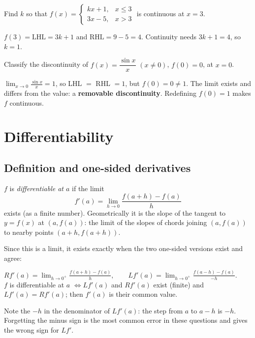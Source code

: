 \begin{example}
Find $k$ so that $f(x)=\begin{cases}kx+1,&x\le3\\ 3x-5,&x>3\end{cases}$ is continuous at $x=3$.
\end{example}
\begin{solution}
$f(3)=\text{LHL}=3k+1$ and $\text{RHL}=9-5=4$. Continuity needs $3k+1=4$, so $k=1$.
\end{solution}

\begin{example}
Classify the discontinuity of $f(x)=\dfrac{\sin x}{x}$ $(x\ne0)$, $f(0)=0$, at $x=0$.
\end{example}
\begin{solution}
$\lim_{x\to0}\frac{\sin x}{x}=1$, so LHL $=$ RHL $=1$, but $f(0)=0\ne1$. The limit exists and differs from the value: a \textbf{removable discontinuity}. Redefining $f(0)=1$ makes $f$ continuous.
\end{solution}

\section{Differentiability}\label{sec:lim-diff}

\subsection{Definition and one-sided derivatives}
\begin{definition}[Derivative]
$f$ is \emph{differentiable at $a$} if the limit
\[
f'(a)=\lim_{h\to0}\frac{f(a+h)-f(a)}{h}
\]
exists (as a finite number). Geometrically it is the slope of the tangent to $y=f(x)$ at $(a,f(a))$: the limit of the slopes of chords joining $(a,f(a))$ to nearby points $(a+h,f(a+h))$.
\end{definition}
Since this is a limit, it exists exactly when the two one-sided versions exist and agree:
\begin{keybox}
$\displaystyle Rf'(a)=\lim_{h\to0^+}\frac{f(a+h)-f(a)}{h},\qquad Lf'(a)=\lim_{h\to0^+}\frac{f(a-h)-f(a)}{-h}.$\\[4pt]
$f$ is differentiable at $a$ \quad$\iff$\quad $Lf'(a)$ and $Rf'(a)$ exist (finite) and $Lf'(a)=Rf'(a)$; then $f'(a)$ is their common value.
\end{keybox}
Note the $-h$ in the denominator of $Lf'(a)$: the step from $a$ to $a-h$ is $-h$. Forgetting the minus sign is the most common error in these questions and gives the wrong sign for $Lf'$.

